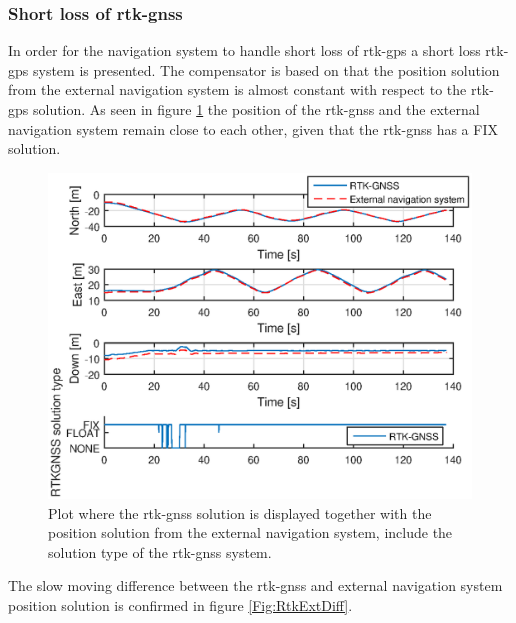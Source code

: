 \subsubsection{Short loss of \gls{rtk-gnss}}\label{ss:ShortLoss}
In order for the navigation system to handle short loss of \gls{rtk-gps} a short loss \gls{rtk-gps} system is presented. The compensator is based on that the position solution from the external navigation system is almost constant with respect to the \gls{rtk-gps} solution. As seen in figure \ref{Fig:RTKExternal} the position of the \gls{rtk-gnss} and the external navigation system remain  close to each other, given that the \gls{rtk-gnss} has a FIX solution. 
\begin{figure}[H]
\centering
\includegraphics[scale=0.6]{figs/Experiment/RtkExternal.eps}
\caption{Plot where the \gls{rtk-gnss} solution is displayed together with the position solution from the external navigation system, include the solution type of the \gls{rtk-gnss} system.}
\label{Fig:RTKExternal}
\end{figure}
The slow moving difference between the \gls{rtk-gnss} and external navigation system position solution is confirmed in figure \ref{Fig:RtkExtDiff}.
